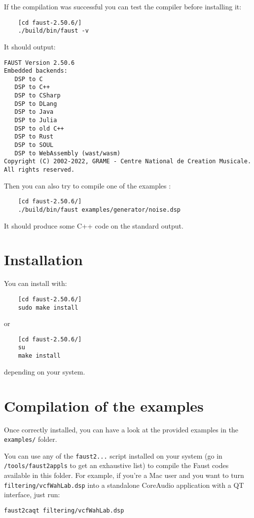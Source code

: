 If the compilation was successful you can test the compiler before installing it:
\begin{lstlisting}
	[cd faust-2.50.6/]
	./build/bin/faust -v
\end{lstlisting}
It should output:
\begin{lstlisting}
FAUST Version 2.50.6
Embedded backends: 
   DSP to C
   DSP to C++
   DSP to CSharp
   DSP to DLang
   DSP to Java
   DSP to Julia
   DSP to old C++
   DSP to Rust
   DSP to SOUL
   DSP to WebAssembly (wast/wasm)
Copyright (C) 2002-2022, GRAME - Centre National de Creation Musicale. All rights reserved. 
\end{lstlisting}

Then you can also try to compile one of the examples :
\begin{lstlisting}
	[cd faust-2.50.6/]
	./build/bin/faust examples/generator/noise.dsp
\end{lstlisting}
It should produce some C++ code on the standard output.

\section{Installation}
You can install \faust with:
\begin{lstlisting}
	[cd faust-2.50.6/]
	sudo make install
\end{lstlisting}
or
\begin{lstlisting}
	[cd faust-2.50.6/]
	su
	make install
\end{lstlisting}
depending on your system.

\section{Compilation of the examples}

Once \faust correctly installed, you can have a look at the provided examples in the \lstinline'examples/' folder. 

You can use any of the \lstinline'faust2...' script installed on your system (go in \lstinline'/tools/faust2appls' to get an exhaustive list) to compile the Faust codes available in this folder. For example, if you're a Mac user and you want to turn \lstinline'filtering/vcfWahLab.dsp' into a standalone CoreAudio application with a QT interface, just run:

\lstinline'faust2caqt filtering/vcfWahLab.dsp'

